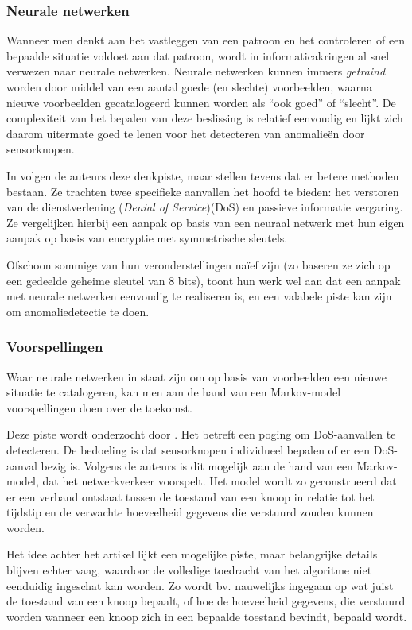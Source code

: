 \subsubsection*{Neurale netwerken}
\label{subsubsection:neuralnetworks}

Wanneer men denkt aan het vastleggen van een patroon en het controleren of een
bepaalde situatie voldoet aan dat patroon, wordt in informaticakringen al snel
verwezen naar neurale netwerken. Neurale netwerken kunnen immers
\emph{getraind} worden door middel van een aantal goede (en slechte)
voorbeelden, waarna nieuwe voorbeelden gecatalogeerd kunnen worden als ``ook
goed'' of ``slecht''. De complexiteit van het bepalen van deze beslissing is
relatief eenvoudig en lijkt zich daarom uitermate goed te lenen voor het
detecteren van anomalie\"en door sensorknopen.

In \citep{ramesh2012wireless} volgen de auteurs deze denkpiste, maar stellen
tevens dat er betere methoden bestaan. Ze trachten twee specifieke aanvallen
het hoofd te bieden: het verstoren van de dienstverlening (\emph{Denial of
Service})(DoS) en passieve informatie vergaring. Ze vergelijken hierbij een
aanpak op basis van een neuraal netwerk met hun eigen aanpak op basis van
encryptie met symmetrische sleutels.

Ofschoon sommige van hun veronderstellingen na\"ief zijn (zo baseren ze zich op
een gedeelde geheime sleutel van 8 bits), toont hun werk wel aan dat een aanpak
met neurale netwerken eenvoudig te realiseren is, en een valabele piste kan
zijn om anomaliedetectie te doen.

\subsubsection*{Voorspellingen}
\label{subsubsection:predictions}

Waar neurale netwerken in staat zijn om op basis van voorbeelden een nieuwe
situatie te catalogeren, kan men aan de hand van een Markov-model
voorspellingen doen over de toekomst.

Deze piste wordt onderzocht door \citep{zhijie2012intrusion}. Het betreft een
poging om DoS-aanvallen te detecteren. De bedoeling is dat sensorknopen
individueel bepalen of er een DoS-aanval bezig is. Volgens de auteurs is dit
mogelijk aan de hand van een Markov-model, dat het netwerkverkeer voorspelt.
Het model wordt zo geconstrueerd dat er een verband ontstaat tussen de toestand
van een knoop in relatie tot het tijdstip en de verwachte hoeveelheid gegevens
die verstuurd zouden kunnen worden.

Het idee achter het artikel lijkt een mogelijke piste, maar belangrijke details
blijven echter vaag, waardoor de volledige toedracht van het algoritme niet
eenduidig ingeschat kan worden. Zo wordt bv. nauwelijks ingegaan op wat juist
de toestand van een knoop bepaalt, of hoe de hoeveelheid gegevens, die
verstuurd worden wanneer een knoop zich in een bepaalde toestand bevindt,
bepaald wordt.
